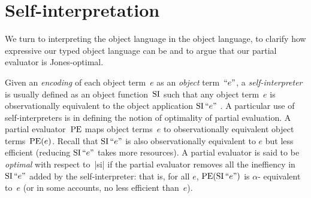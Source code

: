 \ifshort\else
\section{Self-interpretation}\label{selfinterp}

We turn to interpreting the object language in the object language, to
clarify how expressive our typed object language can be and to argue that our
partial evaluator is Jones\hyp optimal.

Given an \emph{encoding} of each object term~$e$ as an \emph{object}
term~$\mathinner{\mathopen{\text{``}}e\mathclose{\text{''}}}$, a \emph{self\hyp interpreter} is usually defined as
an object function~$\operatorname{SI}$ such that any object term~$e$ is
observationally equivalent to the object application $\operatorname{SI}\mathinner{\mathopen{\text{``}}e\mathclose{\text{''}}}$
\citep{jones-partial,taha-tag,Danvy-tagging-encoding}.  A particular
use of self-interpreters is in defining the notion of optimality of
partial evaluation.  A partial evaluator~$\operatorname{PE}$ maps object terms~$e$
to observationally equivalent object terms~$\operatorname{PE}(e)$.  Recall that
$\operatorname{SI}\mathinner{\mathopen{\text{``}}e\mathclose{\text{''}}}$ is also observationally equivalent to $e$ but less
efficient (reducing $\operatorname{SI}\mathinner{\mathopen{\text{``}}e\mathclose{\text{''}}}$ takes more resources). A
partial evaluator is said to be \emph{optimal} with respect to~|si|
\citep{jones-challenging} if the partial evaluator removes all the 
ineffiency in $\operatorname{SI}\mathinner{\mathopen{\text{``}}e\mathclose{\text{''}}}$ added by the self-interpreter: that is,
for all $e$, $\operatorname{PE}(\operatorname{SI}\mathinner{\mathopen{\text{``}}e\mathclose{\text{''}}})$ is $\alpha$\hyp
equivalent to~$e$ (or in some accounts, no less efficient than~$e$).

